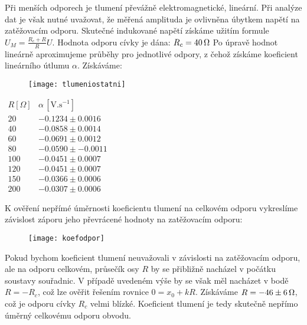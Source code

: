 \documentclass[czech,11pt,a4paper]{article}
\begin{document}
	Při menších odporech je tlumení převážně elektromagnetické, lineární. Při analýze dat je však nutné uvažovat, že měřená amplituda je ovlivněna úbytkem napětí na zatěžovacím odporu. Skutečné indukované napětí získáme užitím formule $U_M = \frac{R_c+R}{R}U$. Hodnota odporu cívky je dána: $R_c = 40 \,\rm \Omega$ Po úpravě hodnot lineárně aproximujeme průběhy pro jednotlivé odpory, z čehož získáme koeficient lineárního útlumu $\alpha$. Získáváme:
	
   \begin{figure}[h]
   \begin{center}
   	
   			\texttt{[image: tlumeniostatni]} 
   \end{center}
   		
    \end{figure} 
    \begin{center}
    		$\begin{array}{l|c}
    	R [\Omega] & \alpha  \, [\mathrm{V.s}^{-1}]           \\ \hline
    	20         & -0.1234 \pm 0.0016  \\ \hline
    	40         & -0.0858 \pm 0.0014  \\ \hline
    	60         & -0.0691\pm 0.0012   \\ \hline
    	80         & -0.0590 \pm -0.0011 \\ \hline
    	100        & -0.0451\pm 0.0007   \\ \hline
    	120        & -0.0451\pm 0.0007  \\ \hline
    	150        & -0.0366 \pm 0.0006  \\ \hline
    	200        & -0.0307\pm 0.0006  
    \end{array}$
    \end{center}
    K ověření nepřímé úměrnosti koeficientu tlumení na celkovém odporu vykreslíme závislost záporu jeho převrácené hodnoty na zatěžovacím odporu:
    
    \begin{figure}[h]
    	\begin{center}
    		
    		\texttt{[image: koefodpor]} 
    	\end{center}
    	\end{figure}
   	Pokud bychom koeficient tlumení neuvažovali v závislosti na zatěžovacím odporu, ale na odporu celkovém, průsečík osy $R$ by se přibližně nacházel v počátku soustavy souřadnic. V případě uvedeném výše by se však měl nacházet v bodě $R = -R_c$, což lze ověřit řešením rovnice $0 = x_0 + kR$. Získáváme $R = -46 \pm 6 \,\rm \Omega$, což je odporu cívky $R_c$ velmi blízké. Koeficient tlumení je tedy skutečně nepřímo úměrný celkovému odporu obvodu.
\end{document}
